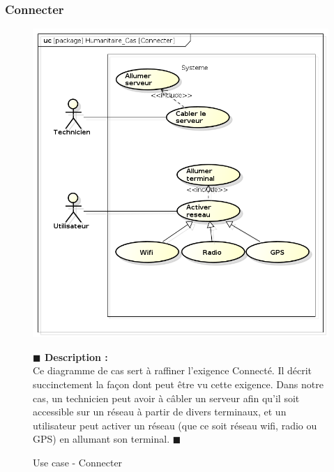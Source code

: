 \documentclass[11pt, titlepage]{report}
\newcommand{\debutDescription}{\noindent\textbf{\textcolor{DescriptionColor}{$\blacksquare$  Description : \\}}}
\newcommand{\finDescription}{\noindent\textcolor{DescriptionColor}{$\blacksquare$}}
\begin{document}
\subsubsection{Connecter}
\begin{figure}[h!]
\begin{center}
\includegraphics[scale=.4]{../images/diagrammes/sysml/use_case/connecter.png}
\end{center}
\caption{Use case - Connecter}
\debutDescription
Ce diagramme de cas sert à raffiner l'exigence Connecté. Il décrit succinctement la façon dont peut être vu cette exigence. Dans notre cas, un technicien peut avoir à câbler un serveur afin qu'il soit accessible sur un réseau à partir de divers terminaux, et un utilisateur peut activer un réseau (que ce soit réseau wifi, radio ou GPS) en allumant son terminal.
\finDescription
\end{figure}


\clearpage
\end{document}
